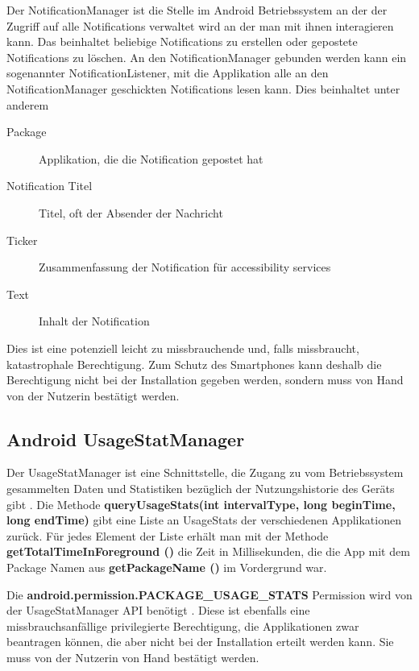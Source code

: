 Der NotificationManager ist die Stelle im Android Betriebssystem an der der Zugriff auf alle Notifications verwaltet wird an der man mit ihnen interagieren kann.
Das beinhaltet beliebige Notifications zu erstellen oder gepostete Notifications zu löschen.
An den NotificationManager gebunden werden kann ein sogenannter NotificationListener, mit die Applikation alle an den NotificationManager geschickten Notifications lesen kann.
Dies beinhaltet unter anderem

\begin{description}
    \item [Package] Applikation, die die Notification gepostet hat
    \item [Notification Titel] Titel, oft der Absender der Nachricht
    \item [Ticker] Zusammenfassung der Notification für accessibility services
    \item [Text] Inhalt der Notification
\end{description}

Dies ist eine potenziell leicht zu missbrauchende und, falls missbraucht, katastrophale Berechtigung.
Zum Schutz des Smartphones kann deshalb die Berechtigung nicht bei der Installation gegeben werden, sondern muss von Hand von der Nutzerin bestätigt werden. 


\subsection {Android UsageStatManager}

Der UsageStatManager ist eine Schnittstelle, die Zugang zu vom Betriebssystem gesammelten Daten
und Statistiken bezüglich der Nutzungshistorie des Geräts gibt \cite{androidusagestat}.
Die Methode \textbf{queryUsageStats(int intervalType, long beginTime, long endTime)} gibt eine Liste an UsageStats der verschiedenen Applikationen zurück.
Für jedes Element der Liste erhält man mit der Methode \textbf{getTotalTimeInForeground ()} die Zeit in Millisekunden,
die die App mit dem Package Namen aus \textbf{getPackageName ()} im Vordergrund war.
\par
Die \textbf{android.permission.PACKAGE\_USAGE\_STATS} Permission wird von der UsageStatManager API benötigt .
Diese ist ebenfalls eine missbrauchsanfällige privilegierte Berechtigung, die Applikationen zwar beantragen können, die aber nicht bei der Installation erteilt werden kann.
Sie muss von der Nutzerin von Hand bestätigt werden.


